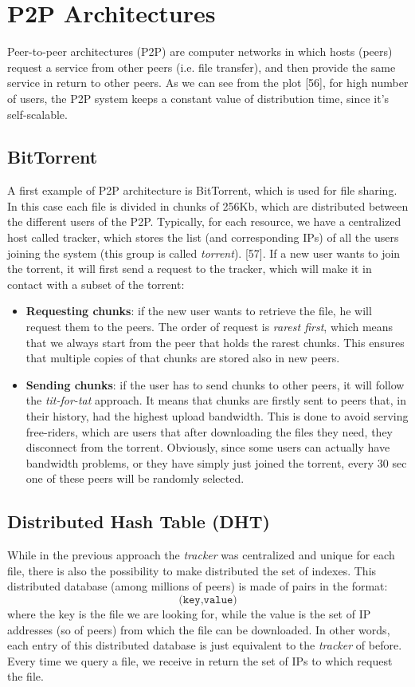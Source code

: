 \section{P2P Architectures}
Peer-to-peer architectures (P2P) are computer networks in which hosts (peers) request a service from other peers (i.e. file transfer), and then provide the same service in return to other peers. As we can see from the plot [56], for high number of users, the P2P system keeps a constant value of distribution time, since it's self-scalable.

\subsection{BitTorrent}
A first example of P2P architecture is BitTorrent, which is used for file sharing. In this case each file is divided in chunks of 256Kb, which are distributed between the different users of the P2P. Typically, for each resource, we have a centralized host called tracker, which stores the list (and corresponding IPs) of all the users joining the system (this group is called \textit{torrent}). [57]. If a new user wants to join the torrent, it will first send a request to the tracker, which will make it in contact with a subset of the torrent:
\begin{itemize}
    \item \textbf{Requesting chunks}: if the new user wants to retrieve the file, he will request them to the peers. The order of request is \textit{rarest first}, which means that we always start from the peer that holds the rarest chunks. This ensures that multiple copies of that chunks are stored also in new peers.
    \item \textbf{Sending chunks}: if the user has to send chunks to other peers, it will follow the \textit{tit-for-tat} approach. It means that chunks are firstly sent to peers that, in their history, had the highest upload bandwidth. This is done to avoid serving free-riders, which are users that after downloading the files they need, they disconnect from the torrent. Obviously, since some users can actually have bandwidth problems, or they have simply just joined the torrent, every 30 sec one of these peers will be randomly selected.
\end{itemize}

\subsection{Distributed Hash Table (DHT)}
While in the previous approach the \textit{tracker} was centralized and unique for each file, there is also the possibility to make distributed the set of indexes. This distributed database (among millions of peers) is made of pairs in the format:
\[\texttt{(key,value)}\]
\noindent where the key is the file we are looking for, while the value is the set of IP addresses (so of peers) from which the file can be downloaded. In other words, each entry of this distributed database is just equivalent to the \textit{tracker} of before. Every time we query a file, we receive in return the set of IPs to which request the file.

